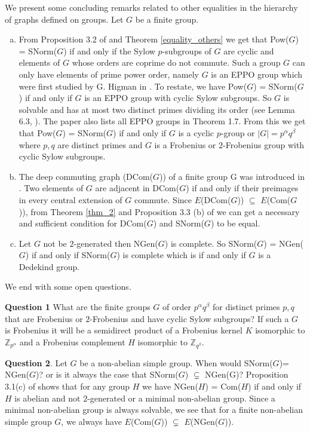 We present some concluding remarks related to other equalities in the hierarchy of graphs defined on groups. Let $G$ be a finite group.
\begin{enumerate}[(a)]
    \item From Proposition 3.2 of \cite{PJC2022} and Theorem \ref{equality_others} we get that Pow($G$) = SNorm($G$) if and only if the Sylow $p$-subgroups of $G$ are cyclic and elements of $G$ whose orders are coprime do not commute. Such a group $G$ can only have elements of prime power order, namely $G$ is an EPPO group which were first studied by G. Higman in \cite{GH1957}. To restate, we have Pow($G$) = SNorm($G$) if and only if $G$ is an EPPO group with cyclic Sylow subgroups. So $G$ is solvable and has at most two distinct primes dividing its order (see Lemma 6.3, \cite{PJCNVM2022}). The paper \cite{PJCNVM2022} also lists all EPPO groups in Theorem 1.7. From this we get that Pow($G$) = SNorm($G$) if and only if $G$ is a cyclic $p$-group or $|G|=p^{\alpha}q^{\beta}$ where $p, q$ are distinct primes and $G$ is a Frobenius or $2$-Frobenius group with cyclic Sylow subgroups.
    \item The deep commuting graph (DCom($G$)) of a finite group G was introduced in  \cite{PJCBK2023}. Two elements of $G$ are adjacent in DCom($G$) if and only if their preimages in every central extension of $G$ commute. Since $E$(DCom($G$)) $\subseteq$ $E$(Com($G$)), from Theorem \ref{thm_2} and Proposition 3.3 (b) of \cite{PJC2022} we can get a necessary and sufficient condition for DCom($G$) and SNorm($G$) to be equal.  
    \item Let $G$ not be $2$-generated then NGen($G$) is complete. So SNorm($G$) = NGen($G$) if and only if SNorm($G$) is complete which is if and only if $G$ is a Dedekind group.
    \end{enumerate}
We end with some open questions.\\ \par
{\bf Question 1} What are the finite groups $G$ of order $p^{\alpha}q^{\beta}$ for distinct primes $p,q$ that are Frobenius or $2$-Frobenius and have cyclic Sylow subgroups? If such a $G$ is Frobenius it will be a semidirect product of a Frobenius kernel $K$ isomorphic to ${\mathbb{Z}_{p^{\alpha}}}$ and a Frobenius complement $H$ isomorphic to ${\mathbb{Z}_{q^{\beta}}}$. 
\\ \par
{\bf Question 2}. Let $G$ be a non-abelian simple group. When would SNorm($G$)= NGen($G$)? or is it always the case that SNorm($G$) $\subsetneq$ NGen(G)? Proposition 3.1(c) of \cite{PJC2022} shows that for any group $H$ we have NGen($H$) = Com($H$) if and only if $H$ is abelian and not $2$-generated or a minimal non-abelian group. Since a minimal non-abelian group is always solvable, we see that for a finite non-abelian simple group $G$, we always have $E$(Com($G$)) $\subsetneq$ $E$(NGen($G$)). 
